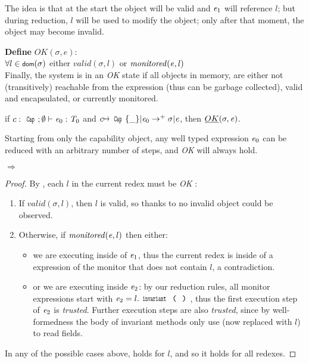 The idea is that at the start the object will be valid and ${\mathit{e}}_1$ will reference $l$;
but during reduction, $l$ will be used to
modify the object; only after that moment, the object may become invalid.


\noindent\textbf{Define} $\mathit{OK}(\sigma,e)$:\\
\indent $\forall l\in\dom(\sigma)$
  either $\mathit{valid}(\sigma,l)$ or $\mathit{monitored}({\mathit{e}},l)$\\

\noindent Finally, the system is in an \emph{OK} state
if all objects in memory, are either
not (transitively) reachable from the expression (thus can be garbage collected),
valid and encapsulated,
or currently monitored.

\begin{theorem}\rm
if $c:\Kw{Cap};\emptyset\vdash \e_0: \T_0$ and
$c\mapsto\Kw{Cap}\{\_\}|\e_0\rightarrow^+ \sigma|\e$, then
$\emph{OK}(\sigma,{\mathit{e}})$.
\end{theorem}
\noindent Starting from only the capability object,
any well typed expression ${\mathit{e}}_0$ can be reduced with an arbitrary number of steps,
and \emph{OK} will always hold.

\begin{theorem}\rm {} $\Rightarrow$ 
\end{theorem}
\begin{proof}
\noindent By , each $l$ in the current redex must be \emph{OK} :
\SSI\begin{enumerate}
	\item If $\mathit{valid}(\sigma,l)$, then $l$ is valid, so thanks to 
	no invalid object could be observed.
	\item Otherwise, if $\mathit{monitored}({\mathit{e}},l)$ then either:
	\begin{itemize}
	 \item we are executing inside of ${\mathit{e}}_1$, thus the current redex is inside of a expression of the monitor that does not contain $l$, a contradiction.
	 \item or we are executing inside ${\mathit{e}}_2$:
	 by our reduction rules, all monitor expressions start with
	 $\e_2=l.\invariant$, thus the first execution step
	 of ${\mathit{e}}_2$ is \emph{trusted}. Further execution steps are also \emph{trusted}, since by well-formedness the body of invariant methods only use \Q@this@ (now replaced with $l$) to read fields.
	\end{itemize}
\end{enumerate}
In any of the possible cases above,  holds for $l$, and so it holds for all redexes.
\end{proof}

